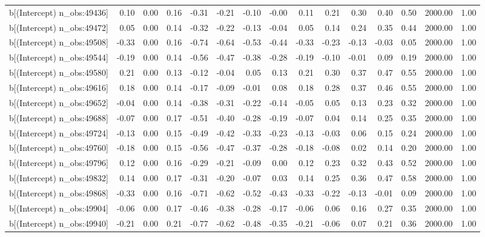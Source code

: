 \begin{table}[ht]
\begin{tabular}{rrrrrrrrrrrrrrr}
  b[(Intercept) n\_obs:49436] & 0.10 & 0.00 & 0.16 & -0.31 & -0.21 & -0.10 & -0.00 & 0.11 & 0.21 & 0.30 & 0.40 & 0.50 & 2000.00 & 1.00 \\ 
  b[(Intercept) n\_obs:49472] & 0.05 & 0.00 & 0.14 & -0.32 & -0.22 & -0.13 & -0.04 & 0.05 & 0.14 & 0.24 & 0.35 & 0.44 & 2000.00 & 1.00 \\ 
  b[(Intercept) n\_obs:49508] & -0.33 & 0.00 & 0.16 & -0.74 & -0.64 & -0.53 & -0.44 & -0.33 & -0.23 & -0.13 & -0.03 & 0.05 & 2000.00 & 1.00 \\ 
  b[(Intercept) n\_obs:49544] & -0.19 & 0.00 & 0.14 & -0.56 & -0.47 & -0.38 & -0.28 & -0.19 & -0.10 & -0.01 & 0.09 & 0.19 & 2000.00 & 1.00 \\ 
  b[(Intercept) n\_obs:49580] & 0.21 & 0.00 & 0.13 & -0.12 & -0.04 & 0.05 & 0.13 & 0.21 & 0.30 & 0.37 & 0.47 & 0.55 & 2000.00 & 1.00 \\ 
  b[(Intercept) n\_obs:49616] & 0.18 & 0.00 & 0.14 & -0.17 & -0.09 & -0.01 & 0.08 & 0.18 & 0.28 & 0.37 & 0.46 & 0.55 & 2000.00 & 1.00 \\ 
  b[(Intercept) n\_obs:49652] & -0.04 & 0.00 & 0.14 & -0.38 & -0.31 & -0.22 & -0.14 & -0.05 & 0.05 & 0.13 & 0.23 & 0.32 & 2000.00 & 1.00 \\ 
  b[(Intercept) n\_obs:49688] & -0.07 & 0.00 & 0.17 & -0.51 & -0.40 & -0.28 & -0.19 & -0.07 & 0.04 & 0.14 & 0.25 & 0.35 & 2000.00 & 1.00 \\ 
  b[(Intercept) n\_obs:49724] & -0.13 & 0.00 & 0.15 & -0.49 & -0.42 & -0.33 & -0.23 & -0.13 & -0.03 & 0.06 & 0.15 & 0.24 & 2000.00 & 1.00 \\ 
  b[(Intercept) n\_obs:49760] & -0.18 & 0.00 & 0.15 & -0.56 & -0.47 & -0.37 & -0.28 & -0.18 & -0.08 & 0.02 & 0.14 & 0.20 & 2000.00 & 1.00 \\ 
  b[(Intercept) n\_obs:49796] & 0.12 & 0.00 & 0.16 & -0.29 & -0.21 & -0.09 & 0.00 & 0.12 & 0.23 & 0.32 & 0.43 & 0.52 & 2000.00 & 1.00 \\ 
  b[(Intercept) n\_obs:49832] & 0.14 & 0.00 & 0.17 & -0.31 & -0.20 & -0.07 & 0.03 & 0.14 & 0.25 & 0.36 & 0.47 & 0.58 & 2000.00 & 1.00 \\ 
  b[(Intercept) n\_obs:49868] & -0.33 & 0.00 & 0.16 & -0.71 & -0.62 & -0.52 & -0.43 & -0.33 & -0.22 & -0.13 & -0.01 & 0.09 & 2000.00 & 1.00 \\ 
  b[(Intercept) n\_obs:49904] & -0.06 & 0.00 & 0.17 & -0.46 & -0.38 & -0.28 & -0.17 & -0.06 & 0.06 & 0.16 & 0.27 & 0.35 & 2000.00 & 1.00 \\ 
  b[(Intercept) n\_obs:49940] & -0.21 & 0.00 & 0.21 & -0.77 & -0.62 & -0.48 & -0.35 & -0.21 & -0.06 & 0.07 & 0.21 & 0.36 & 2000.00 & 1.00 \\ 

\end{tabular}
\end{table}
